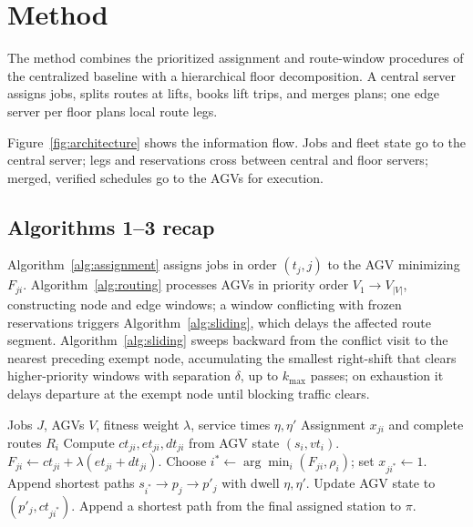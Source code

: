 \section{Method}
\label{sec:method}

The method combines the prioritized assignment and route-window procedures of the centralized baseline \cite{guo2024} with a hierarchical floor decomposition. A central server assigns jobs, splits routes at lifts, books lift trips, and merges plans; one edge server per floor plans local route legs.

Figure~\ref{fig:architecture} shows the information flow. Jobs and fleet state go to the central server; legs and reservations cross between central and floor servers; merged, verified schedules go to the AGVs for execution.

\subsection{Algorithms 1--3 recap}
Algorithm~\ref{alg:assignment} assigns jobs in order $(t_j,j)$ to the AGV minimizing $F_{ji}$. Algorithm~\ref{alg:routing} processes AGVs in priority order $V_1\to V_{|V|}$, constructing node and edge windows; a window conflicting with frozen reservations triggers Algorithm~\ref{alg:sliding}, which delays the affected route segment. Algorithm~\ref{alg:sliding} sweeps backward from the conflict visit to the nearest preceding exempt node, accumulating the smallest right-shift that clears higher-priority windows with separation $\delta$, up to $k_{\max}$ passes; on exhaustion it delays departure at the exempt node until blocking traffic clears.

\begin{algorithm}[t]
\caption{Prioritized job assignment (Algorithm 1)}
\label{alg:assignment}
\small
\begin{algorithmic}[1]
\REQUIRE Jobs $J$, AGVs $V$, fitness weight $\lambda$, service times $\eta,\eta'$
\ENSURE Assignment $x_{ji}$ and complete routes $R_i$
    \STATE Compute $ct_{ji},et_{ji},dt_{ji}$ from AGV state $(s_i,vt_i)$.
    \STATE $F_{ji}\gets ct_{ji}+\lambda(et_{ji}+dt_{ji})$.
  \ENDFOR
  \STATE Choose $i^*\gets\arg\min_i(F_{ji},\rho_i)$; set $x_{ji^*}\gets1$.
  \STATE Append shortest paths $s_{i^*}\to p_j\to p'_j$ with dwell $\eta,\eta'$.
  \STATE Update AGV state to $(p'_j,ct_{ji^*})$.
\ENDFOR
{}
  \STATE Append a shortest path from the final assigned station to $\pi$.
\ENDFOR
\end{algorithmic}
\end{algorithm}

